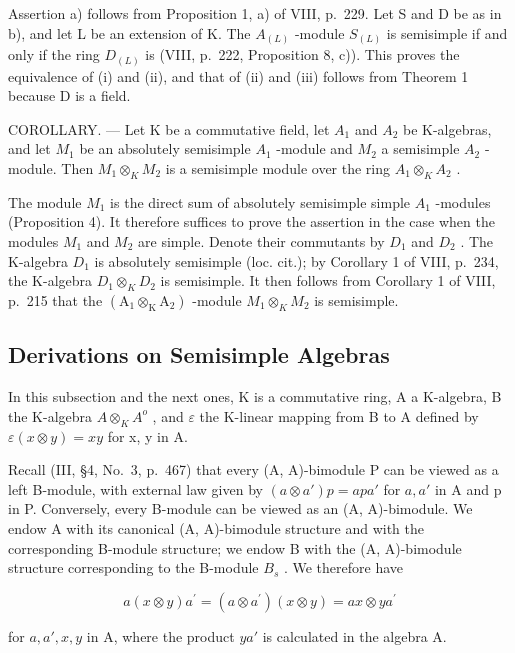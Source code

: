 Assertion a) follows from Proposition 1, a) of VIII, p.~229. Let S and D be as in b), and let L be an extension of K. The \(A_{(L)}\) -module \(S_{(L)}\) is semisimple if and only if the ring \(D_{(L)}\) is (VIII, p.~222, Proposition 8, c)). This proves the equivalence of (i) and (ii), and that of (ii) and (iii) follows from Theorem 1 because D is a field.

COROLLARY. --- Let K be a commutative field, let \(A_{1}\) and \(A_{2}\) be K-algebras, and let \(M_{1}\) be an absolutely semisimple \(A_{1}\) -module and \(M_{2}\) a semisimple \(A_{2}\) -module. Then \(M_{1} \otimes_{K} M_{2}\) is a semisimple module over the ring \(A_{1} \otimes_{K} A_{2}\) .

The module \(M_{1}\) is the direct sum of absolutely semisimple simple \(A_{1}\) -modules (Proposition 4). It therefore suffices to prove the assertion in the case when the modules \(M_{1}\) and \(M_{2}\) are simple. Denote their commutants by \(D_{1}\) and \(D_{2}\) . The K-algebra \(D_{1}\) is absolutely semisimple (loc. cit.); by Corollary 1 of VIII, p.~234, the K-algebra \(D_{1} \otimes_{K} D_{2}\) is semisimple. It then follows from Corollary 1 of VIII, p.~215 that the \((\mathrm{A}_{1} \otimes_{\mathrm{K}} \mathrm{A}_{2})\) -module \(M_{1} \otimes_{K} M_{2}\) is semisimple.

\subsection{Derivations on Semisimple Algebras}

In this subsection and the next ones, K is a commutative ring, A a K-algebra, B the K-algebra \(A \otimes_{K} A^{o}\) , and \(\varepsilon\) the K-linear mapping from B to A defined by \(\varepsilon(x \otimes y) = xy\) for x, y in A.

Recall (III, §4, No.~3, p.~467) that every (A, A)-bimodule P can be viewed as a left B-module, with external law given by \((a \otimes a')p = apa'\) for \(a, a'\) in A and p in P. Conversely, every B-module can be viewed as an (A, A)-bimodule. We endow A with its canonical (A, A)-bimodule structure and with the corresponding B-module structure; we endow B with the (A, A)-bimodule structure corresponding to the B-module \(B_s\) . We therefore have

\[
a (x \otimes y) a ^ {\prime} = (a \otimes a ^ {\prime}) (x \otimes y) = a x \otimes y a ^ {\prime}
\]

for \(a, a', x, y\) in A, where the product \(ya'\) is calculated in the algebra A.

